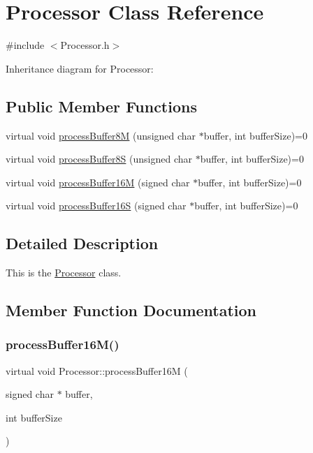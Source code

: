 \hypertarget{classProcessor}{}\section{Processor Class Reference}
\label{classProcessor}


{\ttfamily \#include $<$Processor.\+h$>$}



Inheritance diagram for Processor\+:
\subsection*{Public Member Functions}
\begin{DoxyCompactItemize}
\item 
virtual void \hyperlink{classProcessor_aa28dc423c5ee21b11d907a7c13ad81c8}{process\+Buffer8M} (unsigned char $\ast$buffer, int buffer\+Size)=0
\item 
virtual void \hyperlink{classProcessor_aa1342ae07ebced7b3232d2badf06dd3a}{process\+Buffer8S} (unsigned char $\ast$buffer, int buffer\+Size)=0
\item 
virtual void \hyperlink{classProcessor_ae6494e06d5dfa0e000a809981078b41c}{process\+Buffer16M} (signed char $\ast$buffer, int buffer\+Size)=0
\item 
virtual void \hyperlink{classProcessor_a8e00c52bcb0f38c3707f55fe69351e12}{process\+Buffer16S} (signed char $\ast$buffer, int buffer\+Size)=0
\end{DoxyCompactItemize}


\subsection{Detailed Description}
This is the \hyperlink{classProcessor}{Processor} class. 

\subsection{Member Function Documentation}
\mbox{\label{classProcessor_ae6494e06d5dfa0e000a809981078b41c}} 
\subsubsection{\texorpdfstring{process\+Buffer16\+M()}{processBuffer16M()}}
{\footnotesize\ttfamily virtual void Processor\+::process\+Buffer16M (\begin{DoxyParamCaption}\item[{signed char $\ast$}]{buffer,  }\item[{int}]{buffer\+Size }\end{DoxyParamCaption})\hspace{0.3cm}{\ttfamily [pure virtual]}}

